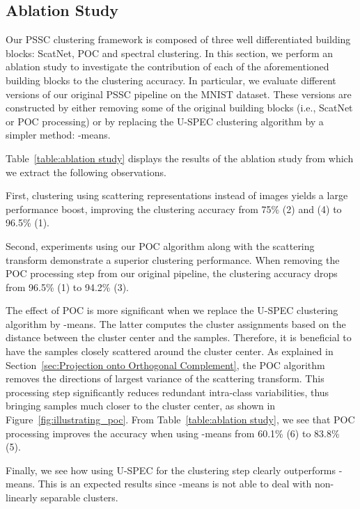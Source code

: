 \documentclass[11pt]{article}
\theoremstyle{definition}
\newcommand{\Table}[1]{Table~\ref{#1}}
\newcommand{\Figure}[1]{Figure~\ref{#1}}
\newcommand{\Section}[1]{Section~\ref{#1}}
\begin{document}
\subsection{Ablation Study}

Our PSSC clustering framework is composed of three well differentiated building blocks: ScatNet, POC and spectral clustering. In this section, we perform an ablation study to investigate the contribution of each of the aforementioned building blocks to the clustering accuracy. In particular, we evaluate different versions of our original PSSC pipeline on the MNIST dataset. These versions are constructed by either removing some of the original building blocks (i.e., ScatNet or POC processing) or by replacing the U-SPEC clustering algorithm by a simpler method: -means.

\Table{table:ablation study} displays the results of the ablation study from which we extract the following observations.

First, clustering using scattering representations instead of images yields a large performance boost, improving the clustering accuracy from 75\% (2) and (4) to 96.5\% (1). 

Second, experiments using our POC algorithm along with the scattering transform demonstrate a superior clustering performance. When removing the POC processing step from our original pipeline, the clustering accuracy drops from 96.5\% (1) to 94.2\% (3). 

The effect of POC is more significant when we replace the U-SPEC clustering algorithm by -means. The latter computes the cluster assignments based on the distance between the cluster center and the samples. Therefore, it is beneficial to have the samples closely scattered around the cluster center. As explained in \Section{sec:Projection onto Orthogonal Complement}, the POC algorithm removes the directions of largest variance of the scattering transform. This processing step significantly reduces redundant intra-class variabilities, thus bringing samples much closer to the cluster center, as shown in \Figure{fig:illustrating_poc}. From \Table{table:ablation study}, we see that POC processing improves the accuracy when using -means from 60.1\% (6) to 83.8\% (5).

Finally, we see how using U-SPEC for the clustering step clearly outperforms -means. This is an expected results since -means is not able to deal with non-linearly separable clusters.
\end{document}
